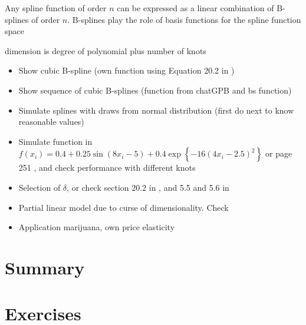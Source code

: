 Any spline function of order $n$ can be expressed as a linear combination of B-splines of order $n$. B-splines play the role of basis functions for the spline function space %

dimension is degree of polynomial plus number of knots 
\begin{itemize}
	\item Show cubic B-spline (own function using Equation 20.2 in \cite{gelman2021bayesian})
	\item Show sequence of cubic B-splines (function from chatGPB and bs function)
	\item Simulate splines with draws from normal distribution (first do next to know reasonable values)
	\item Simulate function in $f(x_i)=0.4+0.25 \sin(8x_i-5)+0.4\exp\left\{-16(4x_i-2.5)^2\right\}$ \cite{Otsu2017} or page 251 \cite{koop2003bayesian}, and check performance with different knots
	\item Selection of $\delta$, or check section 20.2 in \cite{gelman2021bayesian}, and 5.5 and 5.6 in \cite{BMCP2021}
	\item Partial linear model due to curse of dimensionality. Check \cite{koop2003bayesian}
	\item Application marijuana, own price elasticity	
\end{itemize}




\section{Summary}\label{sec11_3}

\section{Exercises}\label{sec11_4}

